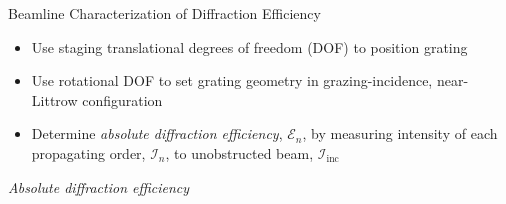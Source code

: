 \documentclass[aspectratio=169,9pt]{beamer}
\begin{document}
\begin{frame}{Beamline Characterization of Diffraction Efficiency}
\begin{minipage}[t]{0.5\linewidth}
\begin{itemize}
\begin{itemize}
 \end{itemize}
 \item Use staging translational degrees of freedom (DOF) to position grating%
 \item Use rotational DOF to set grating geometry in grazing-incidence, near-Littrow configuration
 \item Determine \emph{absolute diffraction efficiency}, $\mathscr{E}_n$, by measuring intensity of each propagating order, $\mathcal{I}_n$, to unobstructed beam, $\mathcal{I}_{\text{inc}}$ 
\end{itemize}
\begin{block}{\footnotesize \emph{Absolute diffraction efficiency}}
\end{block}
 \end{minipage}
\end{frame}
\end{document}
